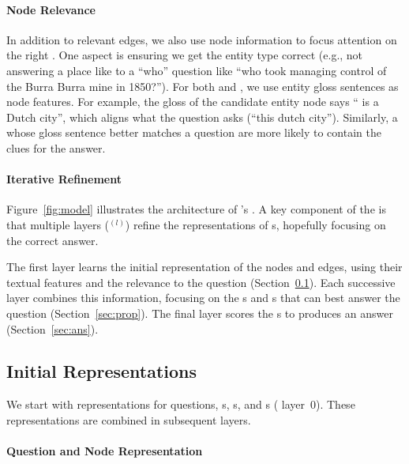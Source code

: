 \paragraph{Node Relevance}

In addition to relevant edges, we also use node
information to focus attention on the right \rightnode{}.
%
One aspect is ensuring we get the entity type correct (e.g., not
answering a place like  to a ``who'' question like
``who took managing control of the Burra Burra mine in 1850?'').
%
For both \leftnode{} and \rightnode{}, we use entity gloss sentences
as node features.
%
For example, the gloss of the candidate entity node says
`` is a Dutch city'', which aligns what the question
asks (``this dutch city'').
%
Similarly, a \leftnode{} whose gloss sentence better matches a
question are more likely to contain the clues for the answer.

\paragraph{Iterative Refinement}

Figure~\ref{fig:model} illustrates the architecture of \name{}'s
.
%
A key component of the  is that multiple layers ($^{(l)}$)
refine the representations of \rightnode{}s, hopefully focusing on the
correct answer.

The first layer learns the initial representation of the nodes and
edges, using their textual features and the relevance to the question
(Section~\ref{sec:init}).
%
Each successive layer combines this information, focusing on the
\tweennode{}s and \rightnode{}s that can best answer the question
(Section~\ref{sec:prop}).
%
The final layer scores the \rightnode{}s to produces an answer
(Section~\ref{sec:ans}).

\subsection{Initial Representations}
\label{sec:init}

We start with representations for questions, \leftnode{}s,
\rightnode{}s, and \tweennode{}s ( layer~0).  These
representations are combined in subsequent layers.

\paragraph{Question and Node Representation}

